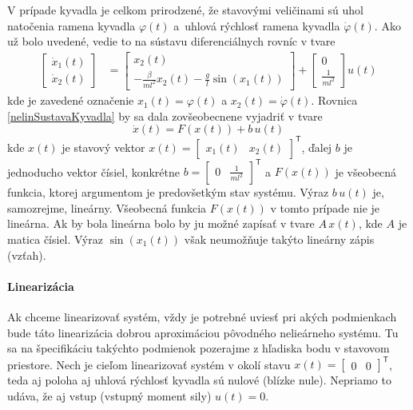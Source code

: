 \documentclass[a4paper, 10pt, ]{article}
\begin{document}
V prípade kyvadla je celkom prirodzené, že stavovými veličinami sú uhol natočenia ramena kyvadla $\varphi(t)$ a~uhlová rýchlosť ramena kyvadla $\dot\varphi(t)$. Ako už bolo uvedené, vedie to na sústavu diferenciálnych rovníc v tvare
	\begin{align} \label{nelinSustavaKyvadla}
		\begin{bmatrix}
			\dot{x}_1(t) \\ \dot{x}_2(t)
		\end{bmatrix}
		&=
		\begin{bmatrix}
			x_2(t) \\ - \frac{\beta}{ml^2} x_2(t) - \frac{g}{l} \sin(x_1(t))
		\end{bmatrix}
		+
		\begin{bmatrix}
			0 \\ \frac{1}{ml^2}
		\end{bmatrix}
		u(t)
	\end{align}
kde je zavedené označenie $x_1(t) = \varphi(t)$ a $x_2(t) = \dot\varphi(t)$. Rovnica \eqref{nelinSustavaKyvadla} by sa dala zovšeobecnene vyjadriť v tvare
\begin{equation}
    \dot x(t) = F\left(x(t)\right) + b\,u(t)
\end{equation}
kde $x(t)$ je stavový vektor $x(t) = \begin{bmatrix} x_1(t) & x_2(t) \end{bmatrix}^\mathsf{T}$, ďalej $b$ je jednoducho vektor čísiel, konkrétne $b = \begin{bmatrix} 0 & \frac{1}{ml^2} \end{bmatrix}^\mathsf{T}$ a $F\left(x(t)\right)$ je všeobecná funkcia, ktorej argumentom je predovšetkým stav systému. Výraz $b\,u(t)$ je, samozrejme, lineárny. Všeobecná funkcia $F\left(x(t)\right)$ v tomto prípade nie je lineárna. Ak by bola lineárna bolo by ju možné zapísať v tvare $A\,x(t)$, kde $A$ je matica čísiel. Výraz $\sin(x_1(t))$ však neumožňuje takýto lineárny zápis (vzťah).




\paragraph{Linearizácia}

Ak chceme linearizovať systém, vždy je potrebné uviesť pri akých podmienkach bude táto linearizácia dobrou aproximáciou pôvodného nelieárneho systému. Tu sa na špecifikáciu takýchto podmienok pozerajme z hľadiska bodu v stavovom priestore. Nech je cieľom linearizovať systém v okolí stavu $x(t) = \begin{bmatrix} 0 & 0 \end{bmatrix}^\mathsf{T}$, teda aj poloha aj uhlová rýchlosť kyvadla sú nulové (blízke nule). Nepriamo to udáva, že aj vstup (vstupný moment sily) $u(t) = 0$.
\end{document}
